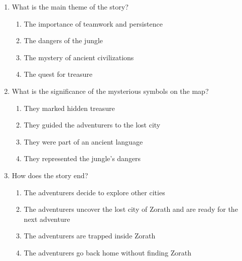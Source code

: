 \documentclass[12pt]{article}
\begin{document}
\begin{enumerate}
\vspace{0.5cm}

\item What is the main theme of the story?
\begin{enumerate}[label=\Alph*.]
    \item The importance of teamwork and persistence
    \item The dangers of the jungle
    \item The mystery of ancient civilizations
    \item The quest for treasure
\end{enumerate}

\vspace{0.5cm}

\item What is the significance of the mysterious symbols on the map?
\begin{enumerate}[label=\Alph*.]
    \item They marked hidden treasure
    \item They guided the adventurers to the lost city
    \item They were part of an ancient language
    \item They represented the jungle's dangers
\end{enumerate}

\vspace{0.5cm}

\item How does the story end?
\begin{enumerate}[label=\Alph*.]
    \item The adventurers decide to explore other cities
    \item The adventurers uncover the lost city of Zorath and are ready for the next adventure
    \item The adventurers are trapped inside Zorath
    \item The adventurers go back home without finding Zorath
\end{enumerate}

\end{enumerate}
\end{document}

